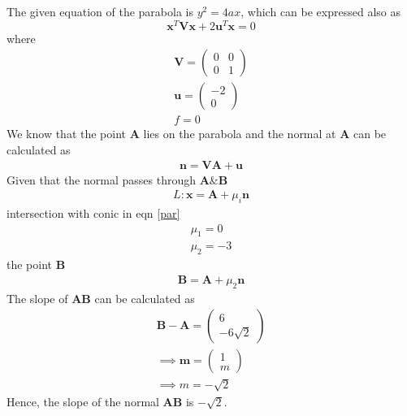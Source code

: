 \documentclass[journal,12pt,twocolumn]{article}
\let\vec\mathbf
\newcommand{\myvec}[1]{\ensuremath{\begin{pmatrix}#1\end{pmatrix}}}
\let\vec\mathbf
\begin{document}
The given equation of the parabola is $y^2 = 4ax$, which can be expressed also as
\begin{equation}
	\vec{x}^T\vec{V}\vec{x} + 2\vec{u}^T\vec{x} = 0
	\label{par}
\end{equation}
where
\begin{align}
	\vec{V} = \myvec{0&0\\0&1} \\
	\vec{u}= \myvec{-2 \\ 0} \\
	f = 0
\end{align}
We know that the point $\vec{A}$ lies on the parabola and 
the normal at $\vec{A}$ can be calculated as
\begin{align}
	\vec{n} = \vec{V}\vec{A} + \vec{u}	
	\label{eq:normal}
\end{align}
Given that the normal passes through $\vec{A} \& \vec{B}$
\begin{align}
	L : \vec{x} = \vec{A} + \mu_i \vec{n}  
\end{align}
intersection with conic in eqn \eqref{par}
\begin{align}
	\mu_1 = 0\\
	\mu_2 = -3
\end{align}
the point $\vec{B}$  
\begin{align}
	\vec{B} = \vec{A} + \mu_2\vec{n}
\end{align}
The slope of $\vec{AB}$ can be calculated as
\begin{align}
	\vec{B-A} = \myvec{6\\-6\sqrt{2}}\\
	\implies \vec{m} = \myvec{1\\m}\\
	\implies m = -\sqrt{2}
\end{align}
	Hence,  the slope of the normal $\vec{AB}$ is $-\sqrt{2}$.
\end{document}
